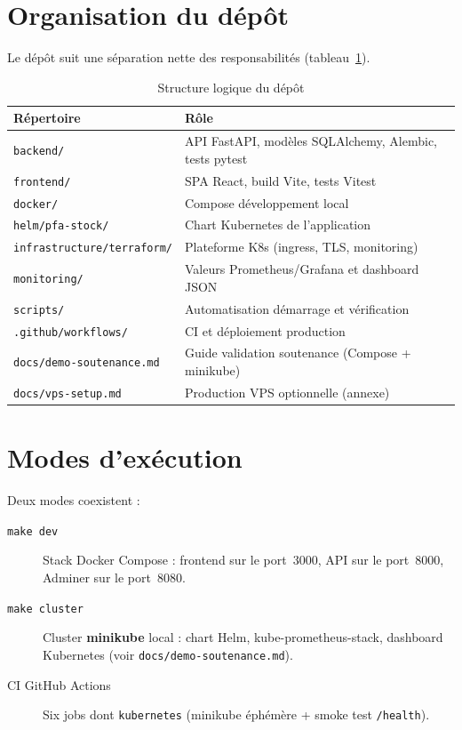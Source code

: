\section{Organisation du dépôt}

Le dépôt suit une séparation nette des responsabilités (tableau~\ref{tab:structure-depot}).

\begin{table}[htbp]
  \centering
  \caption{Structure logique du dépôt}
  \label{tab:structure-depot}
  \begin{tabular}{@{}lp{9.5cm}@{}}
    \toprule
    \textbf{Répertoire} & \textbf{Rôle} \\
    \midrule
    \texttt{backend/} & API FastAPI, modèles SQLAlchemy, Alembic, tests pytest \\
    \texttt{frontend/} & SPA React, build Vite, tests Vitest \\
    \texttt{docker/} & Compose développement local \\
    \texttt{helm/pfa-stock/} & Chart Kubernetes de l'application \\
    \texttt{infrastructure/terraform/} & Plateforme K8s (ingress, TLS, monitoring) \\
    \texttt{monitoring/} & Valeurs Prometheus/Grafana et dashboard JSON \\
    \texttt{scripts/} & Automatisation démarrage et vérification \\
    \texttt{.github/workflows/} & CI et déploiement production \\
    \texttt{docs/demo-soutenance.md} & Guide validation soutenance (Compose + minikube) \\
    \texttt{docs/vps-setup.md} & Production VPS optionnelle (annexe) \\
    \bottomrule
  \end{tabular}
\end{table}

\section{Modes d'exécution}

Deux modes coexistent :

\begin{description}
  \item[\texttt{make dev}] Stack Docker Compose : frontend sur le port~3000, API sur le port~8000, Adminer sur le port~8080.
  \item[\texttt{make cluster}] Cluster \textbf{minikube} local : chart Helm, kube-prometheus-stack, dashboard Kubernetes (voir \texttt{docs/demo-soutenance.md}).
  \item[CI GitHub Actions] Six jobs dont \texttt{kubernetes} (minikube éphémère + smoke test \texttt{/health}).
\end{description}


